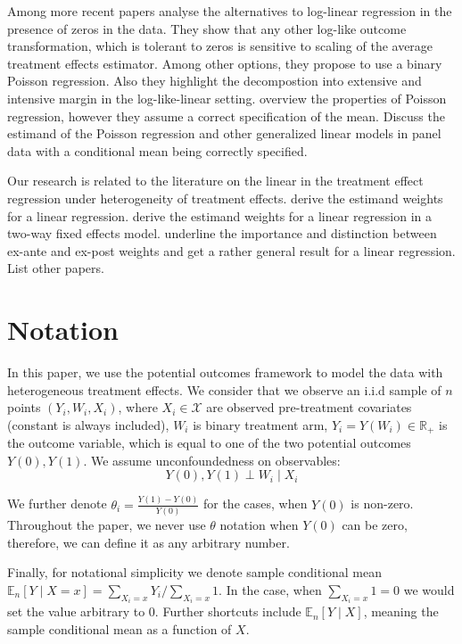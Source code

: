 \documentclass[a4paper,12pt]{article}
\theoremstyle{plain}
\begin{document}
Among more recent papers \cite{chen2022log} analyse the alternatives to log-linear regression in the presence of zeros in the data. They show that any other log-like outcome transformation, which is tolerant to zeros is sensitive to scaling of the average treatment effects estimator. Among other options, they propose to use a binary Poisson regression. Also they highlight the decompostion into extensive and intensive margin in the log-like-linear setting. \cite{cohn2022count} overview the properties of Poisson regression, however they assume a correct specification of the mean. \cite{wooldridgeSimpleApproachesNonlinear2023} Discuss the estimand of the Poisson regression and other generalized linear models in panel data with a conditional mean being correctly specified.

Our research is related to the literature on the linear in the treatment effect regression under heterogeneity of treatment effects. \cite{angrist1998} derive the estimand weights for a linear regression. \cite{de2020two} derive the estimand weights for a linear regression in a two-way fixed effects model. \cite{borusyak2024negative} underline the importance and distinction between ex-ante and ex-post weights and get a rather general result for a linear regression. List other papers.


\section{Notation}

In this paper, we use the potential outcomes framework \citep{imbens2015causal} to model the data with heterogeneous treatment effects. We consider that we observe an i.i.d sample of $n$ points $(Y_i, W_i, X_i)$, where $X_i \in \mathcal{X}$ are observed pre-treatment covariates (constant is always included), $W_i$ is binary treatment arm, $Y_i = Y(W_i) \in \mathbb{R}_+$ is the outcome variable, which is equal to one of the two potential outcomes $Y(0), Y(1)$. We assume unconfoundedness on observables:
\begin{equation} \label{unconf}
    Y(0), Y(1) \perp W_i \mid X_i
\end{equation}

We further denote $\theta_i = \frac{Y(1) - Y(0)}{Y(0)}$ for the cases, when $Y(0)$ is non-zero. Throughout the paper, we never use $\theta$ notation when $Y(0)$ can be zero, therefore, we can define it as any arbitrary number.

Finally, for notational simplicity we denote sample conditional mean $\mathbb{E}_n[Y \mid X = x] = \sum_{X_i = x} Y_i / \sum_{X_i = x} 1$. In the case, when $\sum_{X_i = x} 1 = 0$ we would set the value arbitrary to 0. Further shortcuts include $\mathbb{E}_n[Y \mid X]$, meaning the sample conditional mean as a function of $X$.%
\end{document}
